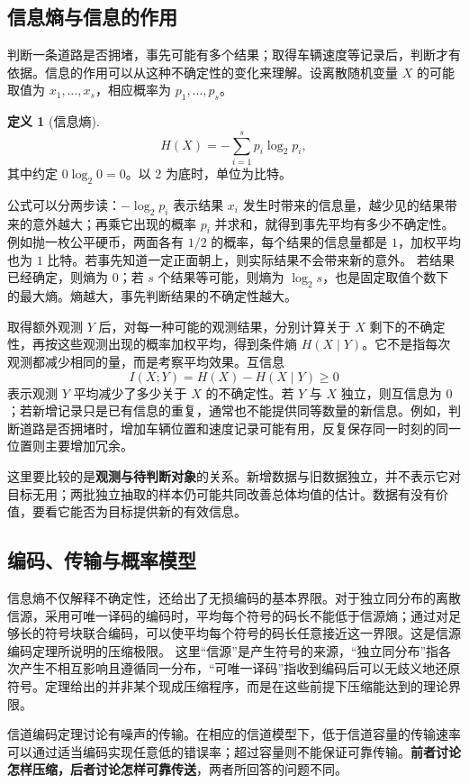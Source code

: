 \documentclass[UTF8,fontset=fandol,a4paper,12pt]{ctexart}
\theoremstyle{definition}
\newtheorem{definition}{定义}[section]
\begin{document}
\subsection{信息熵与信息的作用}
判断一条道路是否拥堵，事先可能有多个结果；取得车辆速度等记录后，判断才有依据。信息的作用可以从这种不确定性的变化来理解。设离散随机变量 $X$ 的可能取值为 $x_1,\ldots,x_s$，相应概率为 $p_1,\ldots,p_s$。
\begin{definition}[信息熵]
\[
 \boxed{H(X)=-\sum_{i=1}^s p_i\log_2 p_i,}
\]
其中约定 $0\log_2 0=0$。以 $2$ 为底时，单位为比特。
\end{definition}
公式可以分两步读：$-\log_2p_i$ 表示结果 $x_i$ 发生时带来的信息量，越少见的结果带来的意外越大；再乘它出现的概率 $p_i$ 并求和，就得到事先平均有多少不确定性。例如抛一枚公平硬币，两面各有 $1/2$ 的概率，每个结果的信息量都是 $1$，加权平均也为 $1$ 比特。若事先知道一定正面朝上，则实际结果不会带来新的意外。
若结果已经确定，则熵为 $0$；若 $s$ 个结果等可能，则熵为 $\log_2 s$，也是固定取值个数下的最大熵。熵越大，事先判断结果的不确定性越大。

取得额外观测 $Y$ 后，对每一种可能的观测结果，分别计算关于 $X$ 剩下的不确定性，再按这些观测出现的概率加权平均，得到条件熵 $H(X\mid Y)$。它不是指每次观测都减少相同的量，而是考察平均效果。互信息
\[
 I(X;Y)=H(X)-H(X\mid Y)\ge0
\]
表示观测 $Y$ 平均减少了多少关于 $X$ 的不确定性。若 $Y$ 与 $X$ 独立，则互信息为 $0$；若新增记录只是已有信息的重复，通常也不能提供同等数量的新信息。例如，判断道路是否拥堵时，增加车辆位置和速度记录可能有用，反复保存同一时刻的同一位置则主要增加冗余。

这里要比较的是\textbf{观测与待判断对象}的关系。新增数据与旧数据独立，并不表示它对目标无用；两批独立抽取的样本仍可能共同改善总体均值的估计。数据有没有价值，要看它能否为目标提供新的有效信息。

\subsection{编码、传输与概率模型}
信息熵不仅解释不确定性，还给出了无损编码的基本界限。对于独立同分布的离散信源，采用可唯一译码的编码时，平均每个符号的码长不能低于信源熵；通过对足够长的符号块联合编码，可以使平均每个符号的码长任意接近这一界限。这是信源编码定理所说明的压缩极限。
这里“信源”是产生符号的来源，“独立同分布”指各次产生不相互影响且遵循同一分布，“可唯一译码”指收到编码后可以无歧义地还原符号。定理给出的并非某个现成压缩程序，而是在这些前提下压缩能达到的理论界限。

信道编码定理讨论有噪声的传输。在相应的信道模型下，低于信道容量的传输速率可以通过适当编码实现任意低的错误率；超过容量则不能保证可靠传输。\textbf{前者讨论怎样压缩，后者讨论怎样可靠传送}，两者所回答的问题不同。
\end{document}
